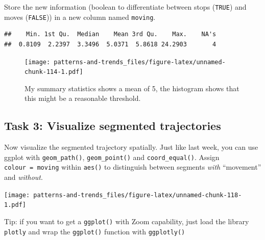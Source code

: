 \documentclass[]{book}
\begin{document}
Store the new information (boolean to differentiate between stops (\texttt{TRUE}) and moves (\texttt{FALSE})) in a new column named \texttt{moving}.

\begin{verbatim}
##    Min. 1st Qu.  Median    Mean 3rd Qu.    Max.    NA's 
##  0.8109  2.2397  3.3496  5.0371  5.8618 24.2903       4
\end{verbatim}

\begin{figure}
\centering
\texttt{[image: patterns-and-trends\_files/figure-latex/unnamed-chunk-114-1.pdf]}
\caption{\label{fig:unnamed-chunk-114}My summary statistics shows a mean of 5, the histogram shows that this might be a reasonable threshold.}
\end{figure}

\hypertarget{task-3-visualize-segmented-trajectories}{%
\subsection{Task 3: Visualize segmented trajectories}\label{task-3-visualize-segmented-trajectories}}

Now visualize the segmented trajectory spatially. Just like last week, you can use ggplot with \texttt{geom\_path()}, \texttt{geom\_point()} and \texttt{coord\_equal()}. Assign \texttt{colour\ =\ moving} within \texttt{aes()} to distinguish between segments \emph{with} ``movement'' and \emph{without}.

\texttt{[image: patterns-and-trends\_files/figure-latex/unnamed-chunk-118-1.pdf]}

Tip: if you want to get a \texttt{ggplot()} with Zoom capability, just load the library \texttt{plotly} and wrap the \texttt{ggplot()} function with \texttt{ggplotly()}
\end{document}
